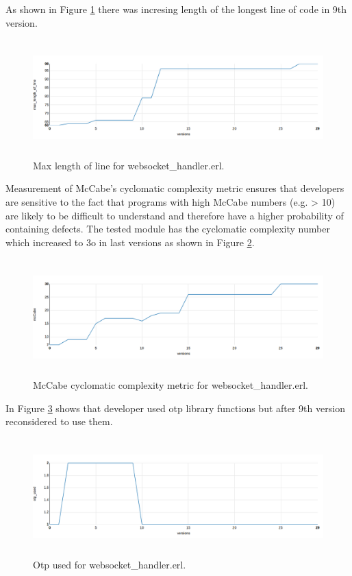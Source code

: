 As shown in Figure \ref{fig:chat5} there was incresing length of the longest line of code in 9th version. 
\begin{figure}[h]
	\centering
	\includegraphics[height=45mm]{figures/chat5.png}
	\caption{Max length of line for websocket\_handler.erl.}
	\label{fig:chat5}
\end{figure}

Measurement of McCabe’s cyclomatic complexity metric ensures that developers are sensitive to the fact that programs with high McCabe numbers (e.g. > 10) are likely to be difficult to understand and therefore have a higher probability of containing defects. The tested module has the cyclomatic complexity number which increased to 3o in last versions as shown in Figure \ref{fig:mcCabe}.

\begin{figure}[h]
	\centering
	\includegraphics[height=45mm]{figures/mcCabe.png}
	\caption{
	McCabe cyclomatic complexity metric for websocket\_handler.erl.}
	\label{fig:mcCabe}
\end{figure}

In Figure \ref{fig:chat2} shows that developer used otp library functions but after 9th version reconsidered to use them.

\begin{figure}[h]
	\centering
	\includegraphics[height=45mm]{figures/chat2.png}
	\caption{
		Otp used for websocket\_handler.erl.}
	\label{fig:chat2}
\end{figure}


